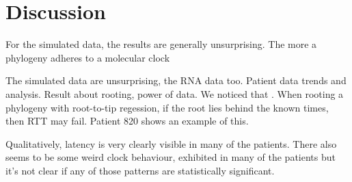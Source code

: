 \section{Discussion} \label{sec:discuss}
For the simulated data, the results are generally unsurprising. The more a phylogeny adheres to a molecular clock 

The simulated data are unsurprising, the RNA data too. Patient data trends and analysis. Result about rooting, power of data.
We noticed that . When rooting a phylogeny with root-to-tip regession, if the root lies behind the known times, then RTT may fail. Patient 820 shows an example of this.

Qualitatively, latency is very clearly visible in many of the patients. 
There also seems to be some weird clock behaviour, exhibited in many of the patients but it's not clear if any of those patterns are statistically significant. 

